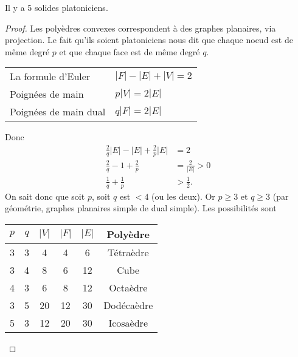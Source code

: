 \begin{mytheo}
  Il y a 5 solides platoniciens.
  \begin{proof}
    Les polyèdres convexes correspondent à des graphes planaires, via projection.
    Le fait qu'ils soient platoniciens nous dit que chaque noeud est de même degré $p$ et que chaque face est de même degré $q$.
    \begin{center}
      \begin{tabular}{ll}
        La formule d'Euler & $|F| - |E| + |V| = 2$\\
        Poignées de main & $p|V| = 2|E|$\\
        Poignées de main dual & $q|F| = 2|E|$
      \end{tabular}
    \end{center}
    Donc
    \begin{align*}
      \frac{2}{q}|E| - |E| + \frac{2}{p} |E| & = 2\\
      \frac{2}{q} - 1 + \frac{2}{p} & = \frac{2}{|E|} > 0\\
      \frac{1}{q} + \frac{1}{p} & > \frac{1}{2}.
    \end{align*}
    On sait donc que soit $p$, soit $q$ est $< 4$ (ou les deux).
    Or $p \geq 3$ et $q \geq 3$ (par géométrie, graphes planaires simple de dual simple).
    Les possibilités sont
    \begin{center}
      \begin{tabular}{|c|c|c|c|c|c|}
        \hline
        $p$ & $q$ & $|V|$ & $|F|$ & $|E|$ & Polyèdre\\
        \hline
         3  &  3  &   4   &   4   &   6   & Tétraèdre\\
         3  &  4  &   8   &   6   &  12   & Cube\\
         4  &  3  &   6   &   8   &  12   & Octaèdre\\
         3  &  5  &  20   &  12   &  30   & Dodécaèdre\\
         5  &  3  &  12   &  20   &  30   & Icosaèdre\\
        \hline
      \end{tabular}
    \end{center}
  \end{proof}
\end{mytheo}

